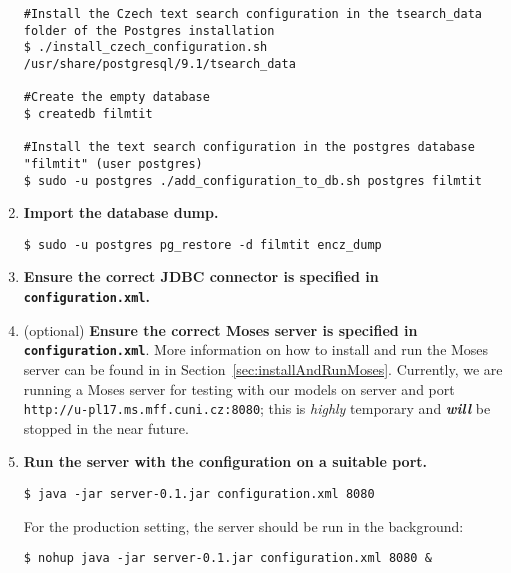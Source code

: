 \begin{enumerate}
\begin{lstlisting}
#Install the Czech text search configuration in the tsearch_data folder of the Postgres installation
$ ./install_czech_configuration.sh /usr/share/postgresql/9.1/tsearch_data

#Create the empty database
$ createdb filmtit

#Install the text search configuration in the postgres database "filmtit" (user postgres)
$ sudo -u postgres ./add_configuration_to_db.sh postgres filmtit
\end{lstlisting}
\vspace*{0.5em}

\item \textbf{Import the database dump.}
\vspace*{0.5em}
\begin{lstlisting}
$ sudo -u postgres pg_restore -d filmtit encz_dump
\end{lstlisting}
\vspace*{0.5em}

\item \textbf{Ensure the correct JDBC connector is specified in {\tt configuration.xml}.}

\item (optional) \textbf{Ensure the correct Moses server is specified in \texttt{configuration.xml}}. More information on how to install and run the Moses server can be found in in Section~\ref{sec:installAndRunMoses}. Currently, we are running a Moses server for testing with our models on server and port \texttt{http://u-pl17.ms.mff.cuni.cz:8080}; this is \emph{highly} temporary and \emph{\textbf{will}} be stopped in the near future.

\item \textbf{Run the server with the configuration on a suitable port.} 
\vspace*{0.5em}
\begin{lstlisting}
$ java -jar server-0.1.jar configuration.xml 8080
\end{lstlisting}
\vspace*{0.5em}

For the production setting, the server should be run in the background:
\vspace*{0.5em}
\begin{lstlisting}
$ nohup java -jar server-0.1.jar configuration.xml 8080 &
\end{lstlisting}
\vspace*{0.5em}






\end{enumerate}



